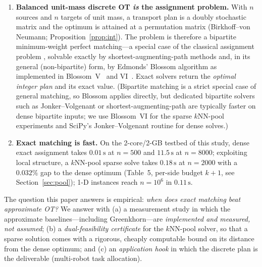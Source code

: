 \documentclass[11pt]{article}
\theoremstyle{remark}
\begin{document}
\begin{enumerate}[leftmargin=2em,itemsep=1pt]
\item \textbf{Balanced unit-mass discrete OT \emph{is} the assignment
problem.} With $n$ sources and $n$ targets of unit mass, a transport plan is
a doubly stochastic matrix and the optimum is attained at a permutation
matrix (Birkhoff--von Neumann; Proposition~\ref{prop:int}). The problem is
therefore a bipartite minimum-weight perfect matching---a special case of
the classical assignment problem \cite{schrijver2003}, solvable exactly by
shortest-augmenting-path methods \cite{jonker1987} and, in its general
(non-bipartite) form, by Edmonds' Blossom algorithm \cite{edmonds1965} as
implemented in Blossom~V~\cite{blossomv} and VI~\cite{blossomvi}. Exact
solvers return the \emph{optimal integer plan} and its exact value. (Bipartite
matching is a strict special case of general matching, so Blossom applies
directly, but dedicated bipartite solvers such as Jonker--Volgenant or
shortest-augmenting-path are typically faster on dense bipartite inputs; we
use Blossom~VI for the sparse $k$NN-pool experiments and SciPy's
Jonker--Volgenant routine for dense solves.)
\item \textbf{Exact matching is fast.} On the 2-core/2-GB testbed of this
study, dense exact assignment takes $0.01\,\mathrm{s}$ at $n=500$ and
$11.5\,\mathrm{s}$ at $n=8000$; exploiting local structure, a $k$NN-pool
sparse solve takes $0.18\,\mathrm{s}$ at $n=2000$ with a $0.032\%$ gap to
the dense optimum (Table~5, per-side budget $k{+}1$, see Section~\ref{sec:pool});
1-D instances reach $n=10^6$ in $0.11\,\mathrm{s}$.
\end{enumerate}

The question this paper answers is empirical: \emph{when does exact
matching beat approximate OT?} We answer with (a) a measurement study in
which the approximate baselines---including Greenkhorn---are \emph{implemented
and measured, not assumed}; (b) a \emph{dual-feasibility certificate} for
the $k$NN-pool solver, so that a sparse solution comes with a rigorous,
cheaply computable bound on its distance from the dense optimum; and (c) an
\emph{application hook} in which the discrete plan is the deliverable
(multi-robot task allocation).
\end{document}
